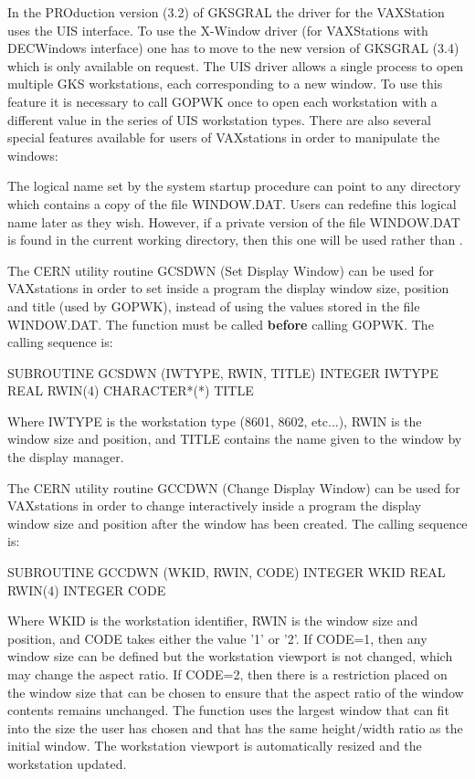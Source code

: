 In the PROduction version (3.2) of GKSGRAL the driver for the VAXStation
uses the UIS interface. To use the X-Window driver (for VAXStations
with DECWindows interface) one has to move to the new version of
GKSGRAL (3.4) which is only available on request.
The UIS driver allows a single process to
open multiple GKS workstations, each corresponding to a new window.
To use this feature it is necessary to call GOPWK once to open each workstation
with a different value in the series of UIS workstation types.
There are also several special features available for users of VAXstations
in order to manipulate the windows:
\begin{UL}
\item The logical name  set by the system startup procedure
 can point to any directory which contains a copy of
the file WINDOW.DAT. Users can redefine this logical name later
as they wish. However, if a private version of the file WINDOW.DAT
is found in the current working directory, then this one will be used
rather than .
\item
{}
The CERN utility routine GCSDWN (Set Display Window) can be used for
VAXstations in order to set inside a program the display window size,
position and title (used by GOPWK), instead of using the  values stored
in the file WINDOW.DAT. The function must be called {\bf before}
calling GOPWK. The calling sequence is:
\begin{XMP}
SUBROUTINE GCSDWN (IWTYPE, RWIN, TITLE)
INTEGER       IWTYPE
REAL          RWIN(4)
CHARACTER*(*) TITLE
\end{XMP}
Where IWTYPE is the workstation type (8601, 8602, etc...),
RWIN is the window size and position, and TITLE contains the name given
to the window by the display manager.
\item
{}
The CERN utility routine GCCDWN (Change Display Window) can be used for
VAXstations in order to change interactively inside a program the display
window size and position after the window has been created.
The calling sequence is:
\begin{XMP}
SUBROUTINE GCCDWN (WKID, RWIN, CODE)
INTEGER       WKID
REAL          RWIN(4)
INTEGER       CODE
\end{XMP}
Where WKID is the workstation identifier, RWIN is the window size and
position, and CODE takes either the value '1' or '2'.
If CODE=1, then any window size can be defined but the workstation viewport
is not changed, which may change the aspect ratio.
If CODE=2, then there is a restriction placed on the window size that can be
chosen to ensure that the aspect ratio of the window contents remains
unchanged. The function uses the largest window that can fit into the size
the user has chosen and that has the same height/width ratio as the initial
window. The workstation viewport is automatically resized and the
workstation updated.
\end{UL}
